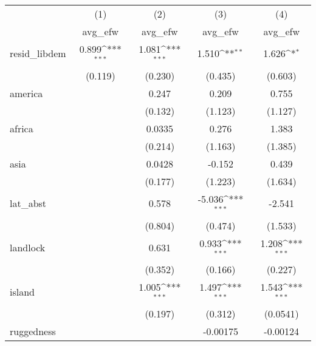{
\def\sym#1{\ifmmode^{#1}\else\(^{#1}\)\fi}
\begin{tabular}{l*{4}{c}}
\hline\hline
            &\multicolumn{1}{c}{(1)}&\multicolumn{1}{c}{(2)}&\multicolumn{1}{c}{(3)}&\multicolumn{1}{c}{(4)}\\
            &\multicolumn{1}{c}{avg\_efw}&\multicolumn{1}{c}{avg\_efw}&\multicolumn{1}{c}{avg\_efw}&\multicolumn{1}{c}{avg\_efw}\\
\hline
resid\_libdem&       0.899\sym{***}&       1.081\sym{***}&       1.510\sym{**} &       1.626\sym{*}  \\
            &     (0.119)         &     (0.230)         &     (0.435)         &     (0.603)         \\
[1em]
america     &                     &       0.247         &       0.209         &       0.755         \\
            &                     &     (0.132)         &     (1.123)         &     (1.127)         \\
[1em]
africa      &                     &      0.0335         &       0.276         &       1.383         \\
            &                     &     (0.214)         &     (1.163)         &     (1.385)         \\
[1em]
asia        &                     &      0.0428         &      -0.152         &       0.439         \\
            &                     &     (0.177)         &     (1.223)         &     (1.634)         \\
[1em]
lat\_abst    &                     &       0.578         &      -5.036\sym{***}&      -2.541         \\
            &                     &     (0.804)         &     (0.474)         &     (1.533)         \\
[1em]
landlock    &                     &       0.631         &       0.933\sym{***}&       1.208\sym{***}\\
            &                     &     (0.352)         &     (0.166)         &     (0.227)         \\
[1em]
island      &                     &       1.005\sym{***}&       1.497\sym{***}&       1.543\sym{***}\\
            &                     &     (0.197)         &     (0.312)         &    (0.0541)         \\
[1em]
ruggedness  &                     &                     &    -0.00175         &    -0.00124         \\

\end{tabular}}
